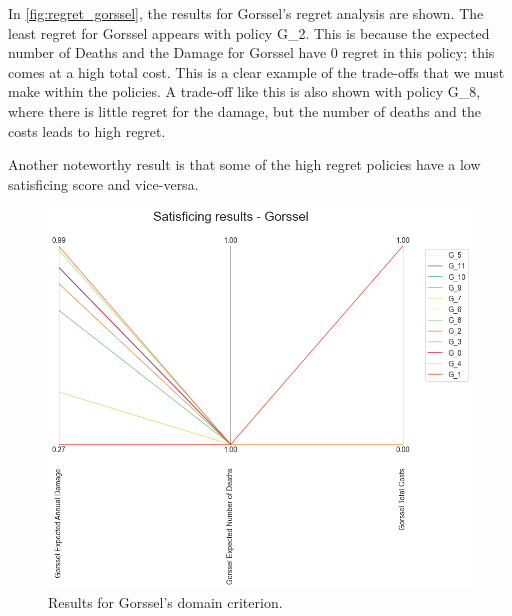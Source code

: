 \noindent In \autoref{fig:regret_gorssel}, the results for Gorssel's regret analysis are shown. The least regret for Gorssel appears with policy G\_2. This is because the expected number of Deaths and the Damage for Gorssel have 0 regret in this policy; this comes at a high total cost. This is a clear example of the trade-offs that we must make within the policies. A trade-off like this is also shown with policy G\_8, where there is little regret for the damage, but the number of deaths and the costs leads to high regret.

Another noteworthy result is that some of the high regret policies have a low satisficing score and vice-versa.

\begin{figure}[H]
  \centering
  \begin{minipage}[b]{0.4\textwidth}
    \includegraphics[width=1.15\textwidth]{report/figures/results/domain_criterion_Gorssel.png}
    \caption{Results for Gorssel's domain criterion.}
    \label{fig:domain_criterion_gorssel}
  \end{minipage}
  \hfill
  \begin{minipage}[b]{0.4\textwidth}

\end{minipage}
\end{figure}
